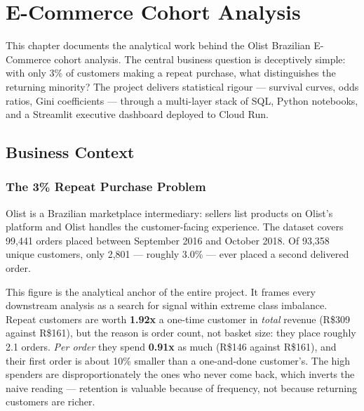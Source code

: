 
\chapter{E-Commerce Cohort Analysis}
\label{ch:ecommerce}


This chapter documents the analytical work behind the Olist Brazilian E-Commerce
cohort analysis. The central business question is deceptively simple: with only
3\% of customers making a repeat purchase, what distinguishes the returning
minority? The project delivers statistical rigour --- survival curves, odds ratios,
Gini coefficients --- through a multi-layer stack of SQL, Python notebooks, and a
Streamlit executive dashboard deployed to Cloud Run.

\section{Business Context}
\label{sec:ecom-context}

\subsection{The 3\% Repeat Purchase Problem}

Olist is a Brazilian marketplace intermediary: sellers list products on Olist's
platform and Olist handles the customer-facing experience. The dataset covers
99,441 orders placed between September 2016 and October 2018. Of 93,358 unique
customers, only 2,801 --- roughly 3.0\% --- ever placed a second delivered order.

This figure is the analytical anchor of the entire project. It frames every
downstream analysis as a search for signal within extreme class imbalance.
Repeat customers are worth \textbf{1.92x} a one-time customer in \emph{total}
revenue (R\$309 against R\$161), but the reason is order count, not basket size:
they place roughly 2.1 orders. \emph{Per order} they spend \textbf{0.91x} as much
(R\$146 against R\$161), and their first order is about 10\% smaller than a
one-and-done customer's. The high spenders are disproportionately the ones who
never come back, which inverts the naive reading --- retention is valuable
because of frequency, not because returning customers are richer.

